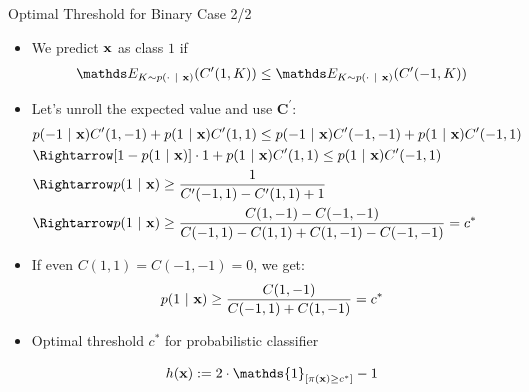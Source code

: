 \documentclass[10pt,compress,t,notes=noshow, xcolor=table]{beamer}
\begin{document}
\begin{frame}{Optimal Threshold for Binary Case 2/2}
            \begin{itemize}
            \item We predict $\mathbf{x}$ as class $1$ if 
            \begin{align*}
                \E_{K \sim p(\cdot ~|~ \xv)}( C^\prime(1,K) )  \leq \E_{K \sim p(\cdot ~|~ \xv)}( C^\prime(-1,K) ) \\
            \end{align*}

			\item Let's unroll the expected value and use $\mathbf{C}^\prime$:
            \footnotesize{
    			\begin{align*}	
                    & p(-1 ~|~ \xv ) C^\prime(1,-1)  + 	p(1 ~|~ \xv ) C^\prime(1,1) \leq  p(-1 ~|~ \xv ) C^\prime(-1,-1)  + 	p(1 ~|~ \xv ) C^\prime(-1,1)  \\ 
                    &\Rightarrow [1 - p(1 ~|~ \xv)] \cdot 1 + p(1 ~|~ \xv) C^\prime(1, 1) \leq p(1 ~|~ \xv) C^\prime(-1, 1) \\
                    &\Rightarrow p(1 ~|~ \xv) \geq \frac{1}{C^\prime(-1, 1) - C^\prime(1, 1) + 1} \\
                    &\Rightarrow p(1 ~|~ \xv) \geq \frac{C(1, -1) - C(-1, -1)}{C(-1, 1) - C(1, 1) + C(1, -1) - C(-1, -1)} = c^*
    			\end{align*}
            }
		
            \item If even $C(1, 1) = C(-1, -1) = 0 $, we get:
            \begin{align*}
                p(1 ~|~ \mathbf{x}) \geq \frac{C(1, -1)}{C(-1, 1) + C(1, -1)} = c^{*}
            \end{align*}	
            
            \item Optimal threshold $c^*$ for probabilistic classifier 
            
            $$   \hx := 2 \cdot \mathds{1}_{[ \pi(\xv) \geq c^*]} -1 $$
							
		\end{itemize}
\end{frame}
\end{document}
